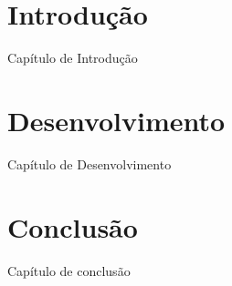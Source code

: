 \begin{codigo}[caption={Exemplo de um documento básico}, label={codigo:documento-basico}, language={myLatex},  breaklines=true]
\incluilistadefiguras

\incluilistadetabelas

\incluilistadequadros

\incluilistadealgoritmos

\incluilistadecodigos

\incluilistadesiglas

\incluilistadesimbolos



\textual

\chapter{Introdução}

Capítulo de Introdução

\chapter{Desenvolvimento}

Capítulo de Desenvolvimento

\chapter{Conclusão}

Capítulo de conclusão

\postextual





\end{codigo}